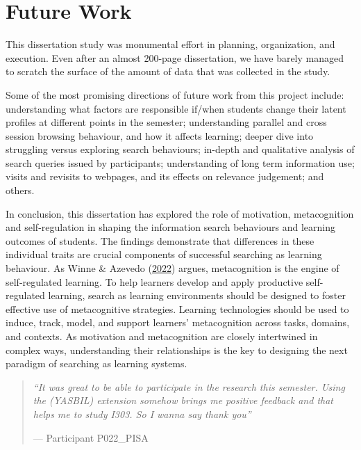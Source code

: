 \documentclass[letterpaper, nobind]{templates/ociamthesis}
\begin{document}
\hypertarget{future-work}{%
\section{Future Work}\label{future-work}}

This dissertation study was monumental effort in planning, organization, and execution.
Even after an almost 200-page dissertation, we have barely managed to scratch the surface of the amount of data that was collected in the study.

Some of the most promising directions of future work from this project include:
understanding what factors are responsible if/when students change their latent profiles at different points in the semester;
understanding parallel and cross session browsing behaviour, and how it affects learning;
deeper dive into struggling versus exploring search behaviours;
in-depth and qualitative analysis of search queries issued by participants;
understanding of long term information use;
visits and revisits to webpages, and its effects on relevance judgement;
and others.

In conclusion, this dissertation has explored the role of motivation, metacognition and self-regulation in shaping the information search behaviours and learning outcomes of students.
The findings demonstrate that differences in these individual traits are crucial components of successful searching as learning behaviour.
As Winne \& Azevedo (\protect\hyperlink{ref-winne2022metacognition}{2022}) argues, metacognition is the engine of self-regulated learning.
To help learners develop and apply productive self-regulated learning, search as learning environments should be designed to foster effective use of metacognitive strategies.
Learning technologies should be used to induce, track, model, and support learners' metacognition across tasks, domains, and contexts.
As motivation and metacognition are closely intertwined in complex ways, understanding their relationships is the key to designing the next paradigm of searching as learning systems.

\begin{quote}
\emph{``It was great to be able to participate in the research this semester. Using the (YASBIL) extension somehow brings me positive feedback and that helps me to study I303. So I wanna say thank you''}

\hfill --- Participant P022\_PISA
\end{quote}

\startappendices
\end{document}
